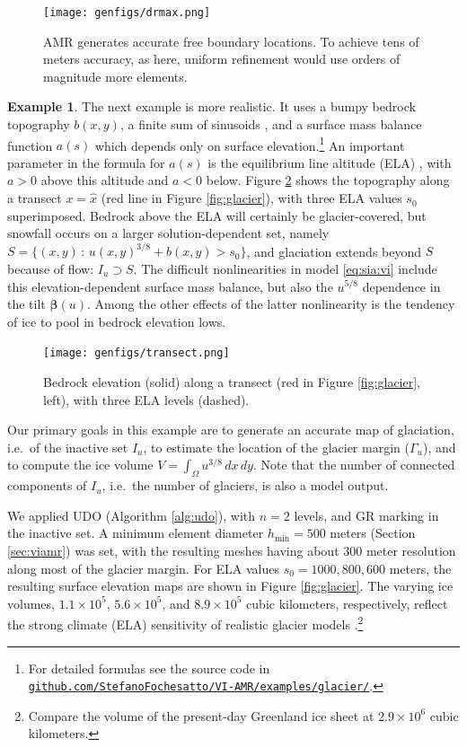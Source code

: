 \documentclass[]{interact}
\theoremstyle{plain}%
\theoremstyle{definition}
\newtheorem{example}[theorem]{Example}
\theoremstyle{remark}
\newcommand{\hmin}{h_{\min}}
\begin{document}
\begin{figure}[ht]
\centering
\texttt{[image: genfigs/drmax.png]}
\caption{AMR generates accurate free boundary locations.  To achieve tens of meters accuracy, as here, uniform refinement would use orders of magnitude more elements.}
\label{fig:domeradiusresults}
\end{figure}

\begin{example} \label{example:realistic}
The next example is more realistic.  It uses a bumpy bedrock topography $b(x,y)$, a finite sum of sinusoids \cite[Example 8.4]{BuelerFarrell2024}, and a surface mass balance function $a(s)$ which depends only on surface elevation.\footnote{For detailed formulas see the source code in \href{https://github.com/StefanoFochesatto/VI-AMR/examples/glacier/}{{\scriptsize \texttt{github.com/StefanoFochesatto/VI-AMR/examples/glacier/}}}.}  An important parameter in the formula for $a(s)$ is the equilibrium line altitude (ELA) \cite{GreveBlatter2009}, with $a>0$ above this altitude and $a< 0$ below.  Figure \ref{fig:transect} shows the topography along a transect $x=\hat x$ (red line in Figure \ref{fig:glacier}), with three ELA values $s_0$ superimposed.  Bedrock above the ELA will certainly be glacier-covered, but snowfall occurs on a larger solution-dependent set, namely $S=\{(x,y)\,:\,u(x,y)^{3/8} + b(x,y) > s_0\}$, and glaciation extends beyond $S$ because of flow: $I_u \supset S$.  The difficult nonlinearities in model \eqref{eq:sia:vi} include this elevation-dependent surface mass balance, but also the $u^{5/8}$ dependence in the tilt $\bm{\beta}(u)$.  Among the other effects of the latter nonlinearity is the tendency of ice to pool in bedrock elevation lows.

\begin{figure}[ht]
\centering
\medskip

\texttt{[image: genfigs/transect.png]}
\caption{Bedrock elevation (solid) along a transect (red in Figure \ref{fig:glacier}, left), with three ELA levels (dashed).}
\label{fig:transect}
\end{figure}

Our primary goals in this example are to generate an accurate map of glaciation, i.e.~of the inactive set $I_u$, to estimate the location of the glacier margin ($\Gamma_u$), and to compute the ice volume $V=\int_\Omega u^{3/8}\,dx\,dy$.  Note that the number of connected components of $I_u$, i.e.~the number of glaciers, is also a model output.

We applied UDO (Algorithm \ref{alg:udo}), with $n=2$ levels, and GR marking in the inactive set.  A minimum element diameter $\hmin=500$ meters (Section \ref{sec:viamr}) was set, with the resulting meshes having about 300 meter resolution along most of the glacier margin.  For ELA values $s_0=1000,800,600$ meters, the resulting surface elevation maps are shown in Figure \ref{fig:glacier}.  The varying ice volumes, $1.1\times 10^5$, $5.6\times 10^5$, and $8.9\times 10^5$ cubic kilometers, respectively, reflect the strong climate (ELA) sensitivity  of realistic glacier models \cite{GreveBlatter2009}.\footnote{Compare the volume of the present-day Greenland ice sheet at $2.9\times 10^6$ cubic kilometers.}


\end{example}
\end{document}
